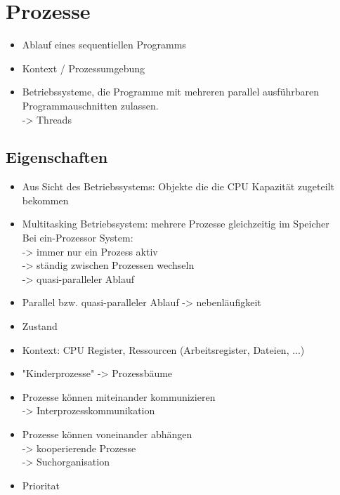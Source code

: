 \documentclass{article}
\begin{document}
\section{Prozesse}

\begin{itemize}
    \item Ablauf eines sequentiellen Programms
    \item Kontext / Prozessumgebung
    \item Betriebssysteme, die Programme mit mehreren parallel ausführbaren Programmauschnitten zulassen. \\
          \hspace*{2em} -> Threads
\end{itemize}

\newpage
\subsection{Eigenschaften}

\begin{itemize}
    \item Aus Sicht des Betriebssystems: Objekte die die CPU Kapazität zugeteilt bekommen
    \item Multitasking Betriebssystem: mehrere Prozesse gleichzeitig im Speicher \\
          \hspace*{2em} Bei ein-Prozessor System: \\
          \hspace*{4em} -> immer nur ein Prozess aktiv \\
          \hspace*{4em} -> ständig zwischen Prozessen wechseln \\
          \hspace*{4em} -> quasi-paralleler Ablauf
    \item Parallel bzw. quasi-paralleler Ablauf -> nebenläufigkeit
    \item Zustand
    \item Kontext: CPU Register, Ressourcen (Arbeitsregister, Dateien, ...)
    \item "Kinderprozesse" -> Prozessbäume
    \item Prozesse können miteinander kommunizieren \\
          \hspace*{2em} -> Interprozesskommunikation
    \item Prozesse können voneinander abhängen \\
          \hspace*{2em} -> kooperierende Prozesse \\
          \hspace*{2em} -> Suchorganisation
    \item Prioritat
\end{itemize}
\end{document}
